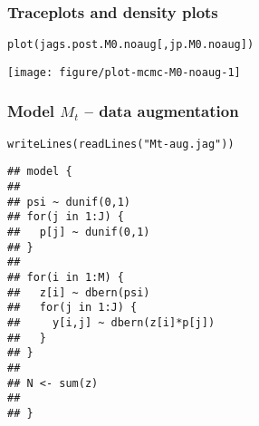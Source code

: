 \documentclass[color=usenames,dvipsnames]{beamer}\usepackage[]{graphicx}\usepackage[]{color}
\makeatletter
\newcommand{\hlstr}[1]{\textcolor[rgb]{0.749,0.012,0.012}{#1}}%
\newcommand{\hlstd}[1]{\textcolor[rgb]{0,0,0}{#1}}%
\newcommand{\hlkwd}[1]{\textcolor[rgb]{0.004,0.004,0.506}{#1}}%
\newenvironment{kframe}{%
 \def\at@end@of@kframe{}%
 \ifinner\ifhmode%
  \def\at@end@of@kframe{\end{minipage}}%
  \begin{minipage}{\columnwidth}%
 \fi\fi%
 \def\FrameCommand##1{\hskip\@totalleftmargin \hskip-\fboxsep
 \colorbox{shadecolor}{##1}\hskip-\fboxsep
     \hskip-\linewidth \hskip-\@totalleftmargin \hskip\columnwidth}%
 \MakeFramed {\advance\hsize-\width
   \@totalleftmargin\z@ \linewidth\hsize
   \@setminipage}}%
 {\par\unskip\endMakeFramed%
 \at@end@of@kframe}
\newenvironment{knitrout}{}{} %
\makeatother
\begin{document}
\begin{frame}[fragile]
  \frametitle{Traceplots and density plots}
\begin{knitrout}\footnotesize
{}\color{fgcolor}\begin{kframe}
\begin{alltt}
\hlkwd{plot}\hlstd{(jags.post.M0.noaug[,jp.M0.noaug])}
\end{alltt}
\end{kframe}

{\centering \texttt{[image: figure/plot-mcmc-M0-noaug-1]} 

}



\end{knitrout}
\end{frame}








\begin{frame}[fragile]
  \frametitle{Model $M_t$ -- data augmentation}
\vspace{-3pt}
\begin{knitrout}\small
{}\color{fgcolor}\begin{kframe}
\begin{alltt}
\hlkwd{writeLines}\hlstd{(}\hlkwd{readLines}\hlstd{(}\hlstr{"Mt-aug.jag"}\hlstd{))}
\end{alltt}
\begin{verbatim}
## model {
## 
## psi ~ dunif(0,1)
## for(j in 1:J) {
##   p[j] ~ dunif(0,1)
## }
## 
## for(i in 1:M) {
##   z[i] ~ dbern(psi)
##   for(j in 1:J) {
##     y[i,j] ~ dbern(z[i]*p[j])
##   }
## }
## 
## N <- sum(z)
## 
## }
\end{verbatim}
\end{kframe}
\end{knitrout}
\end{frame}
\end{document}
